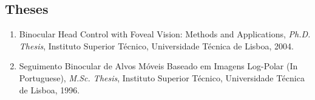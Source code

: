\subsection{Theses}\label{theses}

\begin{enumerate}
\def\labelenumi{\arabic{enumi}.}
\item
  Binocular Head Control with Foveal Vision: Methods and Applications,
  \emph{Ph.D. Thesis}, Instituto Superior Técnico, Universidade Técnica
  de Lisboa, 2004.
\item
  Seguimento Binocular de Alvos Móveis Baseado em Imagens Log-Polar (In
  Portuguese), \emph{M.Sc. Thesis}, Instituto Superior Técnico,
  Universidade Técnica de Lisboa, 1996.
\end{enumerate}
